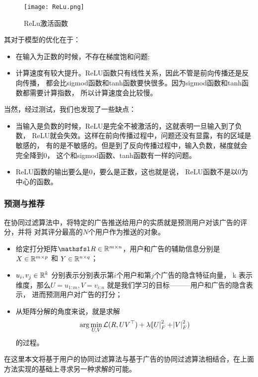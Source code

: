 \begin{figure}[H]
    \centering
    \texttt{[image: ReLu.png]}
    \caption{ReLu激活函数}
\end{figure}

其对于模型的优化在于：
\begin{itemize}
    \item 在输入为正数的时候，不存在梯度饱和问题;
    \item 计算速度有较大提升。ReLU函数只有线性关系，因此不管是前向传播还是反向传播，
    都会比sigmod函数和tanh函数要快很多。因为sigmod函数和tanh函数都需要计算指数，
    所以计算速度会比较慢。
\end{itemize}
当然，经过测试，我们也发现了一些缺点：
\begin{itemize}
    \item 当输入是负数的时候，ReLU是完全不被激活的，这就表明一旦输入到了负数，
    ReLU就会失效。这样在前向传播过程中，问题还没有显露，有的区域是敏感的，
    有的是不敏感的。但是到了反向传播过程中，输入负数，梯度就会完全降到0，
    这个和sigmod函数、tanh函数有一样的问题。
    \item ReLU函数的输出要么是0，要么是正数，这也就是说，
    ReLU函数不是以0为中心的函数。
\end{itemize}

\subsubsection{预测与推荐}

在协同过滤算法中，将特定的广告推送给用户的实质就是预测用户对该广告的评分，并将
对其评分最高的$N$个用户作为推送的对象。

\begin{itemize}
    \item 给定打分矩阵$ \matr{R}\in \BR^{m\times n}$，用户和广告的辅助信息分别是
    $ X\in \mathbb{R}^{m\times p}$ 和 $Y\in \mathbb{R}^{n\times q}$；
    \item $u_i,v_j \in \mathbb{R}^{k}$ 分别表示分别表示第$i$个用户和第$j$个广告的隐含特征向量，
    k 表示维度，那么$ U=u_{1:m},V=v_{i:n}$ 就是我们学习的目标———用户和广告的隐含表示，
    进而预测用户对广告的打分；
    \item 从矩阵分解的角度来说，就是求解
    \begin{equation}
        \arg \min_{U,V} \mathcal{L}(R,UV^{\top})+\lambda(\abs{U}_F^2+\abs{V}_F^2)
    \end{equation}
    的过程。
\end{itemize}

在这里本文将基于用户的协同过滤算法与基于广告的协同过滤算法相结合，在上面方法实现的基础上寻求另一种求解的可能。

